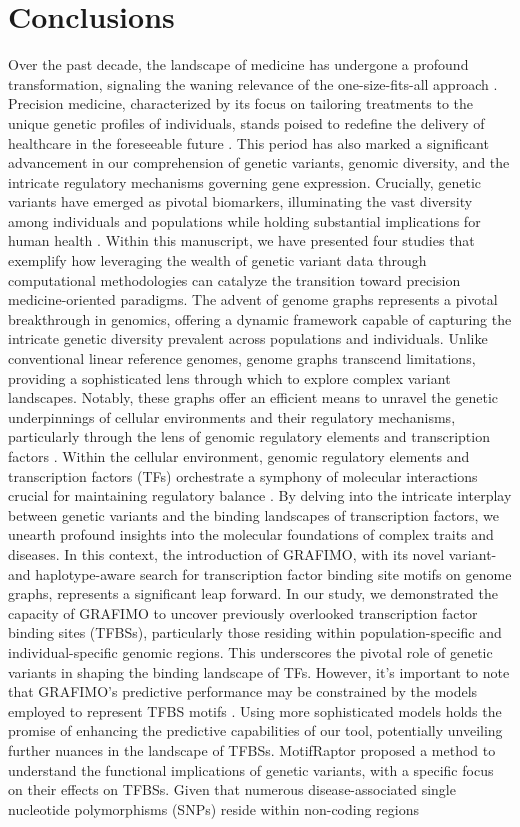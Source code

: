 \documentclass[a4paper, titlepage, openright]{book}
\newcommand{\mychapter}[2]{
    \setcounter{chapter}{#1}
    \setcounter{section}{0}
    \chapter*{#2}
    \addcontentsline{toc}{chapter}{#2}
}
\newcommand{\grafimo}{GRAFIMO\xspace}
\newcommand{\motifraptor}{MotifRaptor\xspace}
\begin{document}
\mychapter{10}{Conclusions}
Over the past decade, the landscape of medicine has undergone a profound transformation, signaling the waning relevance of the one-size-fits-all approach \citep{ginsburg2009genomic}. Precision medicine, characterized by its focus on tailoring treatments to the unique genetic profiles of individuals, stands poised to redefine the delivery of healthcare in the foreseeable future \citep{voelkerding2009next}. This period has also marked a significant advancement in our comprehension of genetic variants, genomic diversity, and the intricate regulatory mechanisms governing gene expression. Crucially, genetic variants have emerged as pivotal biomarkers, illuminating the vast diversity among individuals and populations while holding substantial implications for human health \citep{raphael2014identifying}. Within this manuscript, we have presented four studies that exemplify how leveraging the wealth of genetic variant data through computational methodologies can catalyze the transition toward precision medicine-oriented paradigms. The advent of genome graphs \citep{paten2017genome} represents a pivotal breakthrough in genomics, offering a dynamic framework capable of capturing the intricate genetic diversity prevalent across populations and individuals. Unlike conventional linear reference genomes, genome graphs transcend limitations, providing a sophisticated lens through which to explore complex variant landscapes. Notably, these graphs offer an efficient means to unravel the genetic underpinnings of cellular environments and their regulatory mechanisms, particularly through the lens of genomic regulatory elements and transcription factors \citep{liao2023draft}. Within the cellular environment, genomic regulatory elements and transcription factors (TFs) orchestrate a symphony of molecular interactions crucial for maintaining regulatory balance \citep{lemon2000orchestrated,lambert2018human}. By delving into the intricate interplay between genetic variants and the binding landscapes of transcription factors, we unearth profound insights into the molecular foundations of complex traits and diseases. In this context, the introduction of \grafimo \citep{tognon2021grafimo}, with its novel variant- and haplotype-aware search for transcription factor binding site motifs on genome graphs, represents a significant leap forward. In our study, we demonstrated the capacity of \grafimo to uncover previously overlooked transcription factor binding sites (TFBSs), particularly those residing within population-specific and individual-specific genomic regions. This underscores the pivotal role of genetic variants in shaping the binding landscape of TFs. However, it's important to note that \grafimo's predictive performance may be constrained by the models employed to represent TFBS motifs \citep{tognon2023survey}. Using more sophisticated models holds the promise of enhancing the predictive capabilities of our tool, potentially unveiling further nuances in the landscape of TFBSs. \motifraptor \citep{yao2021motif} proposed a method to understand the functional implications of genetic variants, with a specific focus on their effects on TFBSs. Given that numerous disease-associated single nucleotide polymorphisms (SNPs) reside within non-coding regions 
\end{document}
